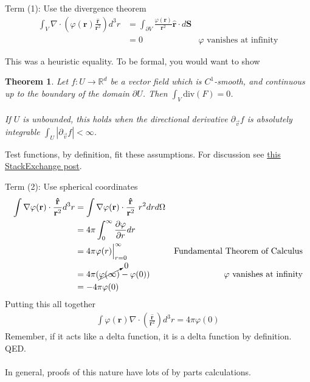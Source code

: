 \documentclass[12pt,fleqn]{article}
\numberwithin{equation}{section} %
\newtheorem{theorem}{Theorem}
\begin{document}
Term (1): Use the divergence theorem
\begin{align}
	\int_V \nabla\cdot \left(\varphi(\mathbf r) \frac{\mathbf{\hat{r}}}{\mathbf r^2} \right) d^3r & = \int_{\partial V} \frac{\varphi(\mathbf r)}{\mathbf r^2}  \mathbf{\hat r} \cdot d\mathbf S \\
	& = 0 & \varphi \text{ vanishes at infinity}
\end{align}
\begin{sidework}
	This was a heuristic equality. To be formal, you would want to show
	\begin{theorem}
		Let $f : U \to \mathbb R^d$ be a vector field which is $C^1$-smooth, and continuous up to the boundary of the domain $\partial U$. Then $\int_V \text{div} (F) = 0$.\\
		\\
		If $U$ is unbounded, this holds when the directional derivative $\partial_{\vec v} f$ is absolutely integrable $\int_U |\partial_{\vec v} f| < \infty$.
	\end{theorem}
	Test functions, by definition, fit these assumptions. For discussion see \href{https://mathoverflow.net/questions/150283/a-special-case-of-the-divergence-theorem}{this StackExchange post}.
\end{sidework}

Term (2): Use spherical coordinates
\begin{align}
	\int \nabla\varphi(\mathbf r) \cdot \frac{\mathbf{\hat{r}}}{\mathbf r^2} d^3r & = \int \nabla \varphi(\mathbf r) \cdot \frac{\mathbf{\hat{r}}}{\mathbf r^2} ~r^2 dr   d \Omega \\
	&= 4\pi   \int_0^\infty \frac{\partial \varphi}{\partial r}  dr \\
	& = 4\pi \varphi(r) \Big|_{r=0}^\infty & \text{Fundamental Theorem of Calculus}\\
	&  = 4\pi ( \cancelto{0}{\varphi(\infty)} - \varphi(0)) & \varphi \text{ vanishes at infinity}\\
	& = -4\pi \varphi(0)
\end{align}
Putting this all together
\begin{align}
	\int \varphi(\mathbf r) \nabla \cdot \left( \frac{\mathbf{\hat{r}}}{\mathbf r^2} \right) d^3 r = 4\pi \varphi(0)
\end{align}
Remember, if it acts like a delta function, it is a delta function by definition. QED.\\
\\
In general, proofs of this nature have lots of by parts calculations.
 
\end{document}
